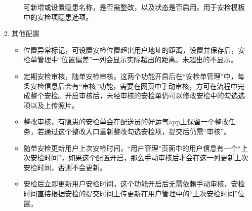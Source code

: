 \documentclass[UTF8]{ctexart}
\begin{document}
\begin{enumerate}
\begin{itemize}
	可新增或设置隐患名称，是否需整改，以及状态是否启用。用于安检模板中的安检项隐患选项。
	\end{itemize}
	\item 其他配置
	
	\begin{itemize} 
	
	\item 位置异常标记，可设置安检位置超出用户地址的距离，设置并保存后，安检单管理中“位置偏差”一列会显示实际超出的距离。未超出的不显示。
	
	\item 定期安检审核，随单安检审核。这两个功能开启后在“安检单管理”中，每条安检信息后会有“审核”功能，需要在网页中手动审核，方可在流程中完成整个安检。开启审核后，未经审核的安检单仍可以修改安检中的勾选选项以及上传照片。
	
	\item 整改审核，有隐患的安检单会在配送员的好运气app上保留一个整改任务，若通过这个整改入口重新整改勾选安检项，提交后仍需“审核”。
	
	\item 随单安检更新用户上次安检时间，“用户管理”页面中的用户信息有一个“上次安检时间”，如果这个配置开启，那么手动审核后才会在这一列更新上次安检时间，否则不会更新。
	
	\item 安检后立即更新用户安检时间，这个功能开启后无需依赖手动审核，安检时间直接根据安检的提交时间上传更新在用户管理中的“上次安检时间”位置。
	\end{itemize}

\end{enumerate}
\end{document}
